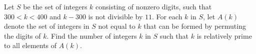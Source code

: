 Let $S$ be the set of integers $k$ consisting of nonzero digits, such that $300 < k < 400$ and $k - 300$ is not divisible by $11$. For each $k$ in $S$, let $A(k)$ denote the set of integers in $S$ not equal to $k$ that can be formed by permuting the digits of $k$. Find the number of integers $k$ in $S$ such that $k$ is relatively prime to all elements of $A(k)$.
